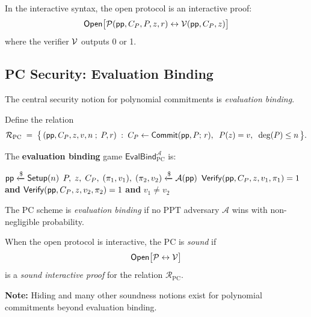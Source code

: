 \documentclass[11pt]{article}
\begin{document}
\begin{remark}
In the interactive syntax, the open protocol is an interactive proof:
\[
  \mathsf{Open}\bigl[\mathcal{P}(\mathsf{pp}, C_P, P, z, r) \leftrightarrow \mathcal{V}(\mathsf{pp}, C_P, z)\bigr]
\]
where the verifier $\mathcal{V}$ outputs 0 or 1.
\end{remark}

\subsection{PC Security: Evaluation Binding}

The central security notion for polynomial commitments is \emph{evaluation binding}.

\begin{definitionbox}
Define the relation
\[
  \mathcal{R}_{\mathrm{PC}} \;=\; \bigl\{\, (\mathsf{pp}, C_P, z, v, n \;;\; P, r) \;:\;
    C_P \leftarrow \mathsf{Commit}(\mathsf{pp}, P;\, r),\;\; P(z) = v,\;\; \deg(P) \le n \,\bigr\}.
\]

The \textbf{evaluation binding} game $\mathsf{EvalBind}^{\mathcal{A}}_{\mathrm{PC}}$ is:
\end{definitionbox}

\begin{algorithm}
\caption{$\mathsf{EvalBind}^{\mathcal{A}}_{\mathrm{PC}}$}
\begin{algorithmic}[1]
  \State $\mathsf{pp} \xleftarrow{\$} \mathsf{Setup}(n)$
  \State $P,\; z,\; C_P,\; (\pi_1, v_1),\; (\pi_2, v_2) \xleftarrow{\$} \mathcal{A}(\mathsf{pp})$
  \State \Return $\mathsf{Verify}(\mathsf{pp}, C_P, z, v_1, \pi_1) = 1$
    \textbf{ and } $\mathsf{Verify}(\mathsf{pp}, C_P, z, v_2, \pi_2) = 1$
    \textbf{ and } $v_1 \neq v_2$
\end{algorithmic}
\end{algorithm}

\noindent The PC scheme is \emph{evaluation binding} if no PPT adversary $\mathcal{A}$ wins with non-negligible probability.

\begin{remark}
When the open protocol is interactive, the PC is \emph{sound} if
\[
  \mathsf{Open}\bigl[\mathcal{P} \leftrightarrow \mathcal{V}\bigr]
\]
is a \emph{sound interactive proof} for the relation $\mathcal{R}_{\mathrm{PC}}$.

\medskip
\noindent\textbf{Note:} Hiding and many other soundness notions exist for polynomial commitments beyond evaluation binding.
\end{remark}

\end{document}
